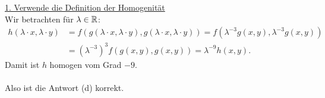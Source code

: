 \underline{1. Verwende die Definition der Homogenität}\\
Wir betrachten für $ \lambda \in \mathbb{R} $:
\begin{align*}
	h(\lambda \cdot x, \lambda \cdot y)
	&=
	f(g(\lambda \cdot x,\lambda \cdot y),g(\lambda \cdot x,\lambda \cdot y))
	=
	f(\lambda^{-3}g(x,y),\lambda^{-3} g(x,y))\\
	&=
	(\lambda^{-3})^3 f(g(x,y),g(x,y))
	=
	\lambda^{-9} h(x,y).
\end{align*}
Damit ist $ h $ homogen vom Grad $ -9 $.\\
\\
Also ist die Antwort (d) korrekt.